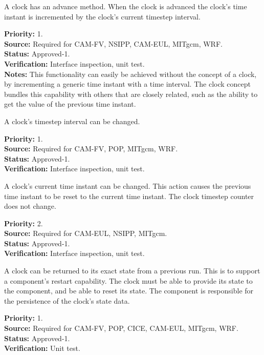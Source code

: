 
A clock has an advance method.  When the clock is advanced the clock's time instant is
incremented by the clock's current timestep interval. 
\begin{reqlist}
{\bf Priority:} 1. \\
{\bf Source:} Required for CAM-FV, NSIPP, CAM-EUL, MITgcm, WRF. \\
{\bf Status:} Approved-1. \\
{\bf Verification:} Interface inspection, unit test. \\
{\bf Notes:} This functionality can easily be achieved without the concept of a
clock, by incrementing a generic time instant with a time interval.  The clock 
concept bundles this capability with others that are closely related, such as the   
ability to get the value of the previous time instant.
\end{reqlist}

A clock's timestep interval can be changed.
\begin{reqlist}
{\bf Priority:} 1. \\
{\bf Source:} Required for CAM-FV, POP, MITgcm, WRF. \\
{\bf Status:} Approved-1. \\
{\bf Verification:} Interface inspection, unit test. 
\end{reqlist}

A clock's current time instant can be changed.  This action causes the previous 
time instant to be reset to the current time instant. The clock timestep
counter does not change.
\begin{reqlist}
{\bf Priority:} 2. \\
{\bf Source:} Required for CAM-EUL, NSIPP, MITgcm. \\
{\bf Status:} Approved-1. \\
{\bf Verification:} Interface inspection, unit test. 
\end{reqlist}

A clock can be returned to its exact state from a previous run.
This is to support a component's restart capability.  The clock must be
able to provide its state to the component, and be able to reset its state.
The component is responsible for the persistence of the clock's state data.
\begin{reqlist}
{\bf Priority:} 1. \\
{\bf Source:} Required for CAM-FV, POP, CICE, CAM-EUL, MITgcm, WRF. \\
{\bf Status:} Approved-1. \\
{\bf Verification:} Unit test. 
\end{reqlist}

